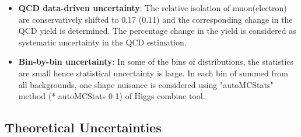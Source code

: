 \begin{itemize}
\item {\bf QCD data-driven uncertainty}: The relative isolation of muon(electron) 
    are conservatively shifted to 0.17 (0.11) and the corresponding change in the 
    QCD yield is determined. The percentage change in the yield is considered as 
    systematic uncertainty in the QCD estimation.
\item {\bf Bin-by-bin uncertainty}: In some of the bins of \mjj distributions, the
    statistics are small hence statistical uncertainty is large. In each bin of
    summed \mjj from all backgrounds, one shape nuisance is considered using 
    "autoMCStats" method (* autoMCStats 0 1) of Higgs combine tool.
\end{itemize}

\subsection{Theoretical Uncertainties}
